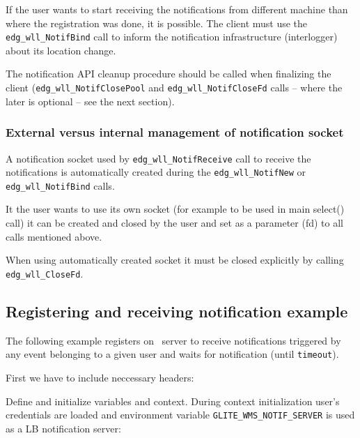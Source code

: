 If the user wants to start receiving the notifications from different
machine than where the registration was done, it is possible. The
client must use the \verb'edg_wll_NotifBind' call to inform the
notification infrastructure (interlogger) about its location change.

The notification API cleanup procedure should be called when
finalizing the client (\verb'edg_wll_NotifClosePool' and 
\verb'edg_wll_NotifCloseFd' calls -- where the later is optional 
-- see the next section).

\subsubsection{External versus internal management of notification socket}
A notification socket used by \verb'edg_wll_NotifReceive' call to
receive the notifications is automatically created during the
\verb'edg_wll_NotifNew' or \verb'edg_wll_NotifBind' calls.

It the user wants to use its own socket (for example to be used in
main select() call) it can be created and closed by the user and set
as a parameter (fd) to all calls mentioned above.

When using automatically created socket it must be closed explicitly
by calling \verb'edg_wll_CloseFd'.

\subsection{Registering and receiving notification example}

The following example registers on \LB\ server to receive
notifications triggered by any event belonging to a
given user and waits for notification (until \verb'timeout').


First we have to include neccessary headers:


Define and initialize variables and context. During context
initialization user's credentials are loaded and environment variable
\verb'GLITE_WMS_NOTIF_SERVER' is used as a LB notification server:
 


